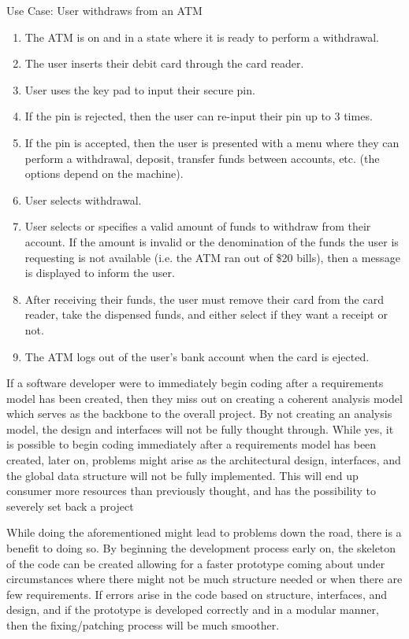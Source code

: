 	Use Case: User withdraws from an ATM
	\begin{enumerate}
		\item The ATM is on and in a state where it is ready to perform a withdrawal.
		\item The user inserts their debit card through the card reader.
		\item User uses the key pad to input their secure pin.
		\item If the pin is rejected, then the user can re-input their pin up to 3 times.
		\item If the pin is accepted, then the user is presented with a menu where they can perform a withdrawal, deposit, transfer funds between accounts, etc. (the options depend on the machine).
		\item User selects withdrawal.
		\item User selects or specifies a valid amount of funds to withdraw from their account. If the amount is invalid or the denomination of the funds the user is requesting is not available (i.e. the ATM ran out of \$20 bills), then a message is displayed to inform the user.
		\item After receiving their funds, the user must remove their card from the card reader, take the dispensed funds, and either select if they want a receipt or not.
		\item The ATM logs out of the user's bank account when the card is ejected.
	\end{enumerate}


\newpage
	If a software developer were to immediately begin coding after a requirements model has been created, then they miss out on creating a coherent analysis model which serves as the backbone to the overall project. By not creating an analysis model, the design and interfaces will not be fully thought through. While yes, it is possible to begin coding immediately after a requirements model has been created, later on, problems might arise as the architectural design, interfaces, and the global data structure will not be fully implemented. This will end up consumer more resources than previously thought, and has the possibility to severely set back a project

	While doing the aforementioned might lead to problems down the road, there is a benefit to doing so. By beginning the development process early on, the skeleton of the code can be created allowing for a faster prototype coming about under circumstances where there might not be much structure needed or when there are few requirements. If errors arise in the code based on structure, interfaces, and design, and if the prototype is developed correctly and in a modular manner, then the fixing/patching process will be much smoother. 


